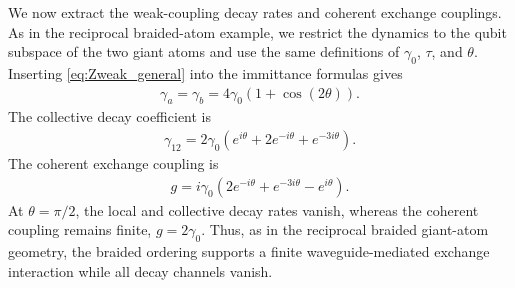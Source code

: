 \documentclass[prx,aps,twocolumn,article]{revtex4-2}
\begin{document}
We now extract the weak-coupling decay rates and coherent exchange
couplings. As in the reciprocal braided-atom example, we restrict the
dynamics to the qubit subspace of the two giant atoms and use the same
definitions of $\gamma_0$, $\tau$, and $\theta$. Inserting
\cref{eq:Zweak_general} into the immittance formulas gives
\begin{align}
    \gamma_a=\gamma_b
    =
    4\gamma_0
    \left(
        1+\cos(2\theta)
    \right).
\end{align}
The collective decay coefficient is
\begin{align}
    \gamma_{12}
    =
    2\gamma_0
    \left(
        e^{i\theta}
        +
        2e^{-i\theta}
        +
        e^{-3i\theta}
    \right).
\end{align}
The coherent exchange coupling is
\begin{align}
    g
    =
    i\gamma_0
    \left(
        2e^{-i\theta}
        +
        e^{-3i\theta}
        -
        e^{i\theta}
    \right).
\end{align}
At $\theta=\pi/2$, the local and collective decay rates vanish, whereas the
coherent coupling remains finite, $g=2\gamma_0$. Thus, as in the reciprocal
braided giant-atom geometry, the braided ordering supports a finite
waveguide-mediated exchange interaction while all decay channels vanish.
\makeatletter
\renewcommand{\bibsection}{%
  \par
  \begingroup
    \baselineskip26\p@
    \bib@device{\hsize}{72\p@}%
  \endgroup
  \nobreak\@nobreaktrue
  \addvspace{19\p@}%
}
\makeatother


\end{document}
